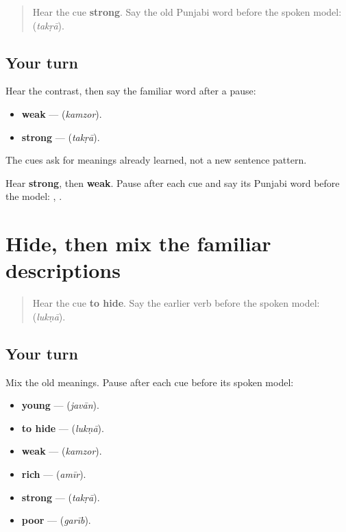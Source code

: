 \label{lesson:PA-R159-strength-weakness-recall}



\begin{quote}
Hear the cue \textbf{strong}. Say the old Punjabi word before the spoken model: \textbf{} (\emph{takṛā}).
\end{quote}

\subsection*{Your turn}
Hear the contrast, then say the familiar word after a pause:

\begin{itemize}
\raggedright
  \item \textbf{weak} — \textbf{} (\emph{kamzor}).
  \item \textbf{strong} — \textbf{} (\emph{takṛā}).
\end{itemize}

The cues ask for meanings already learned, not a new sentence pattern.

\begin{tcolorbox}[breakable,colback=teal!4,colframe=teal!35!black,title={Before you move on}]
Hear \textbf{strong}, then \textbf{weak}. Pause after each cue and say its Punjabi word before the model: \textbf{}, \textbf{}.
\end{tcolorbox}
\section[\texorpdfstring{\pa{ਲੁਕਣਾ} (lukṇā)}{ਲੁਕਣਾ (lukṇā)}]{Hide, then mix the familiar descriptions}

\label{lesson:PA-R159-hide-and-quality-mix}



\begin{quote}
Hear the cue \textbf{to hide}. Say the earlier verb before the spoken model: \textbf{} (\emph{lukṇā}).
\end{quote}

\subsection*{Your turn}
Mix the old meanings. Pause after each cue before its spoken model:

\begin{itemize}
\raggedright
  \item \textbf{young} — \textbf{} (\emph{javān}).
  \item \textbf{to hide} — \textbf{} (\emph{lukṇā}).
  \item \textbf{weak} — \textbf{} (\emph{kamzor}).
  \item \textbf{rich} — \textbf{} (\emph{amīr}).
  \item \textbf{strong} — \textbf{} (\emph{takṛā}).
  \item \textbf{poor} — \textbf{} (\emph{garīb}).
\end{itemize}

